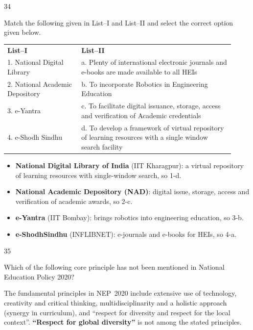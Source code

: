 \begin{question}{34}
{Match the following given in List--I and List--II and select the correct option given below.\\[2pt]
\begin{tabular}{@{}p{0.3\linewidth}p{0.62\linewidth}@{}}
\textbf{List--I} & \textbf{List--II}\\
1. National Digital Library & a. Plenty of international electronic journals and e-books are made available to all HEIs\\
2. National Academic Depository & b. To incorporate Robotics in Engineering Education\\
3. e-Yantra & c. To facilitate digital issuance, storage, access and verification of Academic credentials\\
4. e-Shodh Sindhu & d. To develop a framework of virtual repository of learning resources with a single window search facility\\
\end{tabular}\par}
\begin{explain}
\begin{itemize}
\item \textbf{National Digital Library of India} (IIT Kharagpur): a virtual repository of learning resources with single-window search, so 1-d.
\item \textbf{National Academic Depository (NAD)}: digital issue, storage, access and verification of academic awards, so 2-c.
\item \textbf{e-Yantra} (IIT Bombay): brings robotics into engineering education, so 3-b.
\item \textbf{e-ShodhSindhu} (INFLIBNET): e-journals and e-books for HEIs, so 4-a.
\end{itemize}
\end{explain}
\end{question}

\begin{question}{35}
{Which of the following core principle has not been mentioned in National Education Policy 2020?\par}
\begin{explain}
The fundamental principles in NEP~2020 include extensive use of technology, creativity and critical thinking, multidisciplinarity and a holistic approach (synergy in curriculum), and ``respect for diversity and respect for the local context''. \textbf{``Respect for global diversity''} is not among the stated principles.
\end{explain}
\end{question}

